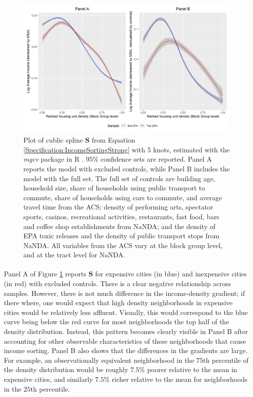 \documentclass[]{article}
\begin{document}
\begin{figure}[!ht]
	\begin{center}
		\includegraphics[width=\textwidth]{income_combined.png}
		\caption{Plot of cublic spline $\mathbf{S}$ from Equation \eqref{Specification:IncomeSortingStrong} with 5 knots, estimated with the \textit{mgcv} package in R \citep{gampackage}. 95\% confidence sets are reported. Panel A reports the model with excluded controls, while Panel B includes the model with the full set. The full set of controls are building age, household size, share of households using public transport to commute, share of households using cars to commute, and average travel time from the ACS; density of performing arts, spectator sports, casinos, recreational activities, restaurants, fast food, bars and coffee shop establishments from NaNDA; and the density of EPA toxic releases and the density of public transport stops from NaNDA. All variables from the ACS vary at the block group level, and at the tract level for NaNDA.  }\label{Figure:IncomeSortingStrong}
	\end{center}
\end{figure}

\paragraph*{}
Panel A of Figure \ref{Figure:IncomeSortingStrong} reports $\mathbf{S}$ for expensive cities (in blue) and inexpensive cities (in red) with excluded controls. There is a clear negative relationship across samples. However, there is not much difference in the income-density gradient; if there where, one would expect that high density neighborhoods in expensive cities would be relatively less affluent. Visually, this would correspond to the blue curve being below the red curve for most neighborhoods the top half of the density distribution. Instead, this pattern becomes clearly visible in Panel B after accounting for other observable characteristics of these neighborhoods that cause income sorting. Panel B also shows that the differences in the gradients are large. For example, an observationally equivalent neighborhood in the $75$th percentile of the density distribution would be roughly $7.5$\% poorer relative to the mean in expensive cities, and similarly $7.5$\% richer relative to the mean for neighborhoods in the $25$th percentile. 
\end{document}

